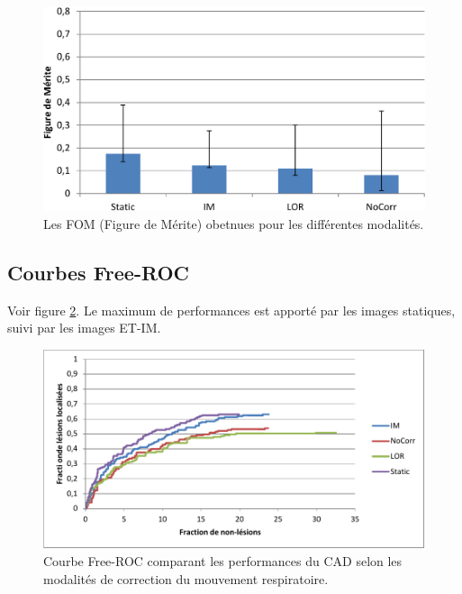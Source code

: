 \begin{figure}[h!]
 \begin{center}
   \includegraphics[width=15cm]{images/FOM_mod}
 \end{center}
 \caption{ \label{lab:fom_mod19} Les FOM (Figure de Mérite) obetnues pour les différentes modalités.}
\end{figure}

\subsection{Courbes Free-ROC}

Voir figure \ref{lab:froc_mod}.
Le maximum de performances est apporté par les images statiques, suivi par les images ET-IM.

\begin{figure}[h!]
 \begin{center}
   \includegraphics[width=15cm]{images/FROC_mod}
 \end{center}
 \caption{ \label{lab:froc_mod} Courbe Free-ROC comparant les performances du CAD selon les modalités de correction du mouvement respiratoire.}
\end{figure}








